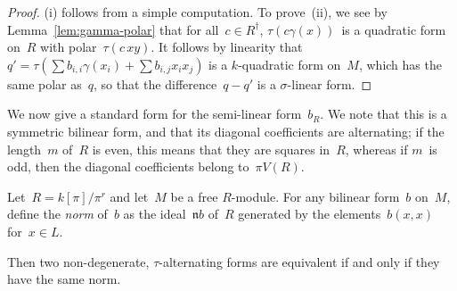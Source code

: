 \documentclass{article}
\def\mat#1{\begin{pmatrix}#1\end{pmatrix}}
\let\fr\mathfrak
\begin{document}
\begin{proof}
(i) follows from a simple computation. To prove~(ii), we see by
Lemma~\ref{lem:gamma-polar} that for all~$c ∈ R^{†}$, $τ(c γ(x))$~is a
quadratic form on~$R$ with polar~$τ(c\, xy)$. It follows by linearity
that~$q' = τ(∑ b_{i,i} γ(x_i) + ∑ b_{i,j} x_i x_j)$ is a $k$-quadratic
form on~$M$, which has the same polar as~$q$, so that
the difference~$q - q'$ is a $σ$-linear form.
\end{proof}

We now give a standard form for the semi-linear form~$b_R$. We note that
this is a symmetric bilinear form, and that its diagonal coefficients are
alternating; if the length~$m$ of~$R$ is even, this means that they are
squares in~$R$, whereas if $m$~is odd, then the diagonal coefficients
belong to~$π V(R)$.


\begin{prop}\label{prop:eqv-norm}
Let~$R = k[π]/π^r$ and let~$M$ be a free $R$-module. For any bilinear
form~$b$ on~$M$, define the \emph{norm} of~$b$ as the ideal~$\fr n b$ of~$R$
generated by the elements~$b(x, x)$ for~$x ∈ L$.

Then two non-degenerate, $τ$-alternating forms are equivalent if and only
if they have the same norm.
\end{prop}


\end{document}
